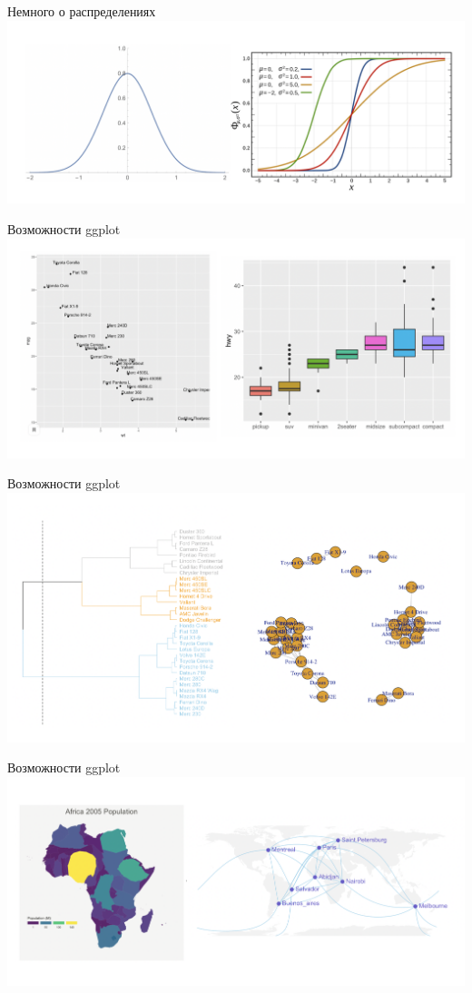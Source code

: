 \documentclass[notes,12pt, aspectratio=169]{beamer}
\begin{document}
\begin{frame}{Немного о распределениях}
	\centering \includegraphics[scale = 0.5]{ris4.png}
\end{frame}

\begin{frame}{Возможности ggplot}
	\centering \includegraphics[scale = 0.5]{ris5.png}
\end{frame}

\begin{frame}{Возможности ggplot}
	\centering \includegraphics[scale = 0.45]{ris6.png}
\end{frame}

\begin{frame}{Возможности ggplot}
	\centering \includegraphics[scale = 0.5]{ris7.png}
\end{frame}
\end{document}
